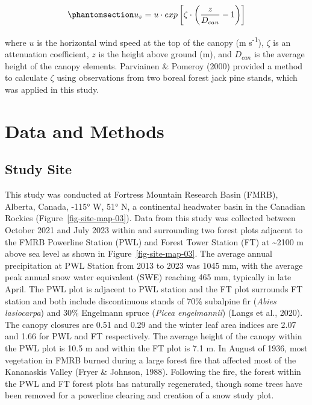 \documentclass[
  letterpaper,
]{tex/uofsthesis-cs}
\begin{document}
\begin{equation}\phantomsection\label{eq-cionco}{
u_z = u\cdot exp\left[\zeta\cdot\left(\frac{z}{D_{can}}-1\right)\right]
}\end{equation}

where \(u\) is the horizontal wind speed at the top of the canopy (m
s\textsuperscript{-1}), \(\zeta\) is an attenuation coefficient, \(z\)
is the height above ground (m), and \(D_{can}\) is the average height of
the canopy elements. Parviainen \& Pomeroy (2000) provided a method to
calculate \(\zeta\) using observations from two boreal forest jack pine
stands, which was applied in this study.

\section{Data and Methods}\label{data-and-methods}

\subsection{Study Site}\label{study-site}

This study was conducted at Fortress Mountain Research Basin (FMRB),
Alberta, Canada, -115° W, 51° N, a continental headwater basin in the
Canadian Rockies (Figure~\ref{fig-site-map-03}). Data from this study
was collected between October 2021 and July 2023 within and surrounding
two forest plots adjacent to the FMRB Powerline Station (PWL) and Forest
Tower Station (FT) at \textasciitilde2100 m above sea level as shown in
Figure~\ref{fig-site-map-03}. The average annual precipitation at PWL
Station from 2013 to 2023 was 1045 mm, with the average peak annual snow
water equivalent (SWE) reaching 465 mm, typically in late April. The PWL
plot is adjacent to PWL station and the FT plot surrounds FT station and
both include discontinuous stands of 70\% subalpine fir (\emph{Abies
lasiocarpa}) and 30\% Engelmann spruce (\emph{Picea engelmannii}) (Langs
et al., 2020). The canopy closures are 0.51 and 0.29 and the winter leaf
area indices are 2.07 and 1.66 for PWL and FT respectively. The average
height of the canopy within the PWL plot is 10.5 m and within the FT
plot is 7.1 m. In August of 1936, most vegetation in FMRB burned during
a large forest fire that affected most of the Kananaskis Valley (Fryer
\& Johnson, 1988). Following the fire, the forest within the PWL and FT
forest plots has naturally regenerated, though some trees have been
removed for a powerline clearing and creation of a snow study plot.
\end{document}

